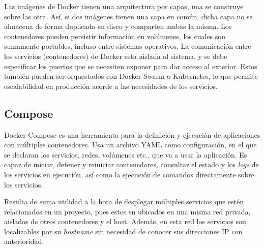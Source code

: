 Las imágenes de Docker tienen una arquitectura por capas, una se construye sobre las otra. Así, si dos imágenes tienen una capa en común, dicha capa no se almacena de forma duplicada en disco y comparten ambas la misma. Los contenedores pueden persistir información en volúmenes, los cuales son sumamente portables, incluso entre sistemas operativos. La comunicación entre los servicios (contenedores) de Docker esta aislada al sistema, y se debe especificar los puertos que se necesiten exponer para dar acceso al exterior. Estos también pueden ser orquestados con Docker Swarm o Kubernetes, lo que permite escalabilidad en producción acorde a las necesidades de los servicios.

\subsection{Compose}

Docker-Compose es una herramienta para la definición y ejecución de aplicaciones con múltiples contenedores. Usa un archivo YAML como configuración, en el que se declaran los servicios, redes, volúmenes etc., que va a usar la aplicación. Es capaz de iniciar, detener y reiniciar contenedores, consultar el estado y los \textit{logs} de los servicios en ejecución, así como la ejecución de comandos directamente sobre los servicios.      

Resulta de suma utilidad a la hora de desplegar múltiples servicios que estén relacionados en un proyecto, pues estos sn ubicados en una misma red privada, aislados de otros contenedores y el host. Además, en esta red los servicios son localizables por su \textit{hostname} sin necesidad de conocer sus direcciones IP con anterioridad.

